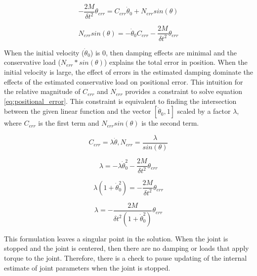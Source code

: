\begin{equation}
- \dfrac{2M}{\delta t^{2}} \theta_{err} = C_{err} \dot{\theta}_{0} + N_{err} sin \left(\theta \right)
\end{equation}

\begin{equation} \label{eq:positional_error}
N_{err} sin \left(\theta \right) = 
- \dot{\theta}_{0} C_{err}
- \dfrac{2M}{\delta t^{2}} \theta_{err}
\end{equation}

When the initial velocity ($\dot{\theta}_{0}$) is 0, then damping effects are minimal and the conservative load ($N_{err} * sin(\theta)$) explains the total error in position. When the initial velocity is large, the effect of errors in the estimated damping dominate the effects of the estimated conservative load on positional error. This intuition for the relative magnitude of $C_{err}$ and $N_{err}$ provides a constraint to solve equation \ref{eq:positional_error}. This constraint is equivalent to finding the intersection between the given linear function and the vector $[\dot{\theta}_{0}, 1]$ scaled by a factor $\lambda$, where $C_{err}$ is the first term and 
$N_{err} sin(\theta)$ is the second term.

\begin{equation} \label{eq:find_C}
C_{err} = \lambda \dot{\theta}, N_{err} = \dfrac{\lambda}{sin \left(\theta \right)}
\end{equation}

\begin{equation}
\lambda = 
- \lambda \dot{\theta}_{0}^{2}
- \dfrac{2M}{\delta t^{2}} \theta_{err}
\end{equation}

\begin{equation}
\lambda \left(1
+ \dot{\theta}_{0}^{2} \right)
=
- \dfrac{2M}{\delta t^{2}} \theta_{err}
\end{equation}

\begin{equation} \label{eq:lambda_def}
\lambda 
=
- \dfrac{2M}{\delta t^{2} \left(1 + \dot{\theta}_{0}^{2} \right)} \theta_{err}
\end{equation}

This formulation leaves a singular point in the solution. When the joint is stopped and the joint is centered, then there are no damping or loads that apply torque to the joint. Therefore, there is a check to pause updating of the internal estimate of joint parameters when the joint is stopped.


